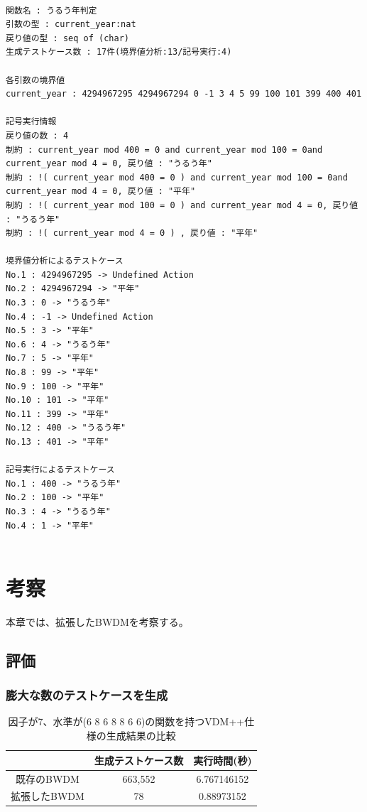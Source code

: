 \documentclass[uplatex, report, a4j, 10pt]{jsbook}
\begin{document}
\lstset{language=}
\noindent\begin{minipage}{\textwidth}
  \begin{lstlisting}[caption=拡張したBWDMにコード\ref{fig:multiple_definition}を適用した際の出力,label=fig:extended_multiple_definition]

関数名 : うるう年判定
引数の型 : current_year:nat 
戻り値の型 : seq of (char)
生成テストケース数 : 17件(境界値分析:13/記号実行:4)

各引数の境界値
current_year : 4294967295 4294967294 0 -1 3 4 5 99 100 101 399 400 401 

記号実行情報
戻り値の数 : 4
制約 : current_year mod 400 = 0 and current_year mod 100 = 0and current_year mod 4 = 0, 戻り値 : "うるう年"
制約 : !( current_year mod 400 = 0 ) and current_year mod 100 = 0and current_year mod 4 = 0, 戻り値 : "平年"
制約 : !( current_year mod 100 = 0 ) and current_year mod 4 = 0, 戻り値 : "うるう年"
制約 : !( current_year mod 4 = 0 ) , 戻り値 : "平年"

境界値分析によるテストケース
No.1 : 4294967295 -> Undefined Action
No.2 : 4294967294 -> "平年"
No.3 : 0 -> "うるう年"
No.4 : -1 -> Undefined Action
No.5 : 3 -> "平年"
No.6 : 4 -> "うるう年"
No.7 : 5 -> "平年"
No.8 : 99 -> "平年"
No.9 : 100 -> "平年"
No.10 : 101 -> "平年"
No.11 : 399 -> "平年"
No.12 : 400 -> "うるう年"
No.13 : 401 -> "平年"

記号実行によるテストケース
No.1 : 400 -> "うるう年"
No.2 : 100 -> "平年"
No.3 : 4 -> "うるう年"
No.4 : 1 -> "平年"
    
\end{lstlisting}
\end{minipage}

\chapter{考察}\label{cha:Evaluation}
本章では、拡張したBWDMを考察する。

\section{評価}
\subsection{膨大な数のテストケースを生成}

\begin{table}[tp]
  \begin{center}
    \caption{因子が7、水準が(6 8 6 8 8 6 6)の関数を持つVDM++仕様の生成結果の比較}
    \label{tab:pict4java_result}
    \begin{tabular}{c|c|c}
                   & 生成テストケース数 & 実行時間(秒) \\
      \hline
      \hline
      既存のBWDM   & 663,552            & 6.767146152  \\ \hline
      拡張したBWDM & 78                 & 0.88973152
    \end{tabular}
  \end{center}
\end{table}
\end{document}
